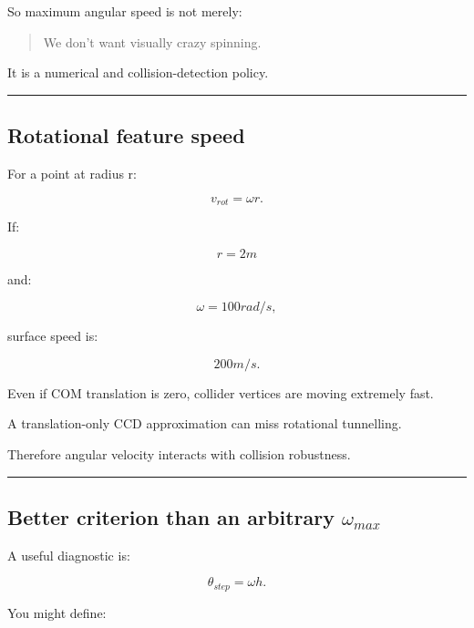 So maximum angular speed is not merely:

\begin{quote}
We don't want visually crazy spinning.
\end{quote}

It is a numerical and collision-detection policy.

\begin{center}\rule{0.5\linewidth}{0.5pt}\end{center}

\subsection{Rotational feature speed}\label{06-engine-ii-ch038-rotational-feature-speed}

\hypertarget{06-engine-ii-ch038-rotational-feature-speed}{}

For a point at radius r:

\[
v_{rot}
=
\omega r.
\]

If:

\[
r=2m
\]

and:

\[
\omega=100rad/s,
\]

surface speed is:

\[
200m/s.
\]

Even if COM translation is zero, collider vertices are moving extremely fast.

A translation-only CCD approximation can miss rotational tunnelling.

Therefore angular velocity interacts with collision robustness.

\begin{center}\rule{0.5\linewidth}{0.5pt}\end{center}

\subsection{\texorpdfstring{Better criterion than an arbitrary \(\omega_{max}\)}{Better criterion than an arbitrary \textbackslash omega\_\{max\}}}\label{06-engine-ii-ch038-better-criterion-than-an-arbitrary-omega_max}

\hypertarget{06-engine-ii-ch038-better-criterion-than-an-arbitrary-omega_max}{}

A useful diagnostic is:

\[
\theta_{step}
=
\omega h.
\]

You might define:

